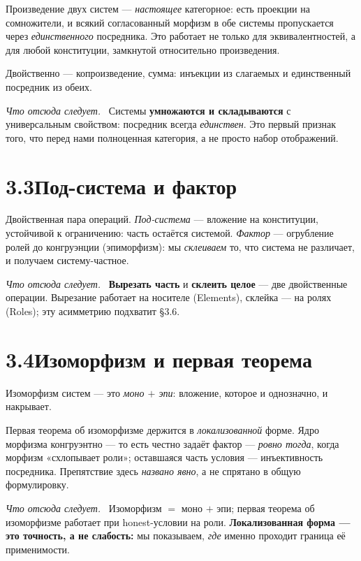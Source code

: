 \documentclass[12pt,a4paper]{article}
\newcommand{\rezultat}{\medskip\noindent\emph{Что отсюда следует.}\ }
\begin{document}
Произведение двух систем --- \emph{настоящее} категорное: есть проекции на сомножители, и всякий
согласованный морфизм в обе системы пропускается через \emph{единственного} посредника. Это работает
не только для эквивалентностей, а для любой конституции, замкнутой относительно произведения.

Двойственно --- копроизведение, сумма: инъекции из слагаемых и единственный посредник из обеих.

\rezultat
Системы \textbf{умножаются и складываются} с универсальным свойством: посредник всегда \emph{единствен}.
Это первый признак того, что перед нами полноценная категория, а не просто набор отображений.

\section*{3.3\quad Под-система и фактор}

Двойственная пара операций. \emph{Под-система} --- вложение на конституции, устойчивой к ограничению:
часть остаётся системой. \emph{Фактор} --- огрубление ролей до конгруэнции (эпиморфизм): мы
\emph{склеиваем} то, что система не различает, и получаем систему-частное.

\rezultat
\textbf{Вырезать часть} и \textbf{склеить целое} --- две двойственные операции. Вырезание работает на
носителе (Elements), склейка --- на ролях (Roles); эту асимметрию подхватит §3.6.

\section*{3.4\quad Изоморфизм и первая теорема}

Изоморфизм систем --- это \emph{моно $+$ эпи}: вложение, которое и однозначно, и накрывает.

Первая теорема об изоморфизме держится в \emph{локализованной} форме. Ядро морфизма конгруэнтно ---
то есть честно задаёт фактор --- \emph{ровно тогда}, когда морфизм «схлопывает роли»; оставшаяся часть
условия --- инъективность посредника. Препятствие здесь \emph{названо явно}, а не спрятано в общую
формулировку.

\rezultat
Изоморфизм $=$ моно $+$ эпи; первая теорема об изоморфизме работает при honest-условии на роли.
\textbf{Локализованная форма --- это точность, а не слабость:} мы показываем, \emph{где} именно проходит
граница её применимости.
\end{document}
